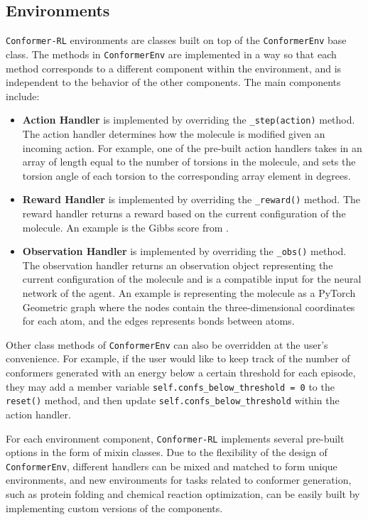 \documentclass[twoside,11pt]{article}
\newcommand{\code}[1]{\texttt{#1}}
\newcommand{\titleofpaper}{Conformer-RL}
\begin{document}
\subsection{Environments}
\code{\titleofpaper} environments are classes built on top of the \code{ConformerEnv} base class. The methods in \code{ConformerEnv} are implemented in a way so that each method corresponds to a different component within the environment, and is independent to the behavior of the other components. The main components include:
\begin{itemize}
  \item \textbf{Action Handler} is implemented by overriding the \code{\_step(action)} method. The action handler determines how the molecule is modified given an incoming action. For example, one of the pre-built action handlers takes in an array of length equal to the number of torsions in the molecule, and sets the torsion angle of each torsion to the corresponding array element in degrees.
  \item \textbf{Reward Handler} is implemented by overriding the \code{\_reward()} method. The reward handler returns a reward based on the current configuration of the molecule. An example is the Gibbs score from \citet{gogineni2020torsionnet}.
  \item \textbf{Observation Handler} is implemented by overriding the \code{\_obs()} method. The observation handler returns an observation object representing the current configuration of the molecule and is a compatible input for the neural network of the agent. An example is representing the molecule as a PyTorch Geometric graph where the nodes contain the three-dimensional coordinates for each atom, and the edges represents bonds between atoms.
\end{itemize}
Other class methods of \code{ConformerEnv} can also be overridden at the user's convenience. For example, if the user would like to keep track of the number of conformers generated with an energy below a certain threshold for each episode, they may add a member variable \code{self.confs\_below\_threshold = 0} to the \code{reset()} method, and then update \code{self.confs\_below\_threshold} within the action handler.

For each environment component, \code{\titleofpaper} implements several pre-built options in the form of mixin classes. Due to the flexibility of the design of \code{ConformerEnv}, different handlers can be mixed and matched to form unique environments, and new environments for tasks related to conformer generation, such as protein folding and chemical reaction optimization, can be easily built by implementing custom versions of the components.
\end{document}
